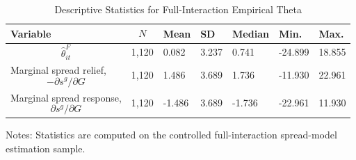 \begin{table}[H]\centering
\begin{threeparttable}
\caption{Descriptive Statistics for Full-Interaction Empirical Theta}
\label{tab:theta_descriptive_stats}
\scriptsize
\begin{tabularx}{\textwidth}{lYYYYYY}
\toprule
Variable & $$N$$ & Mean & SD & Median & Min. & Max. \\
\midrule
$$\widehat{\theta}^{F}_{it}$$ & 1,120 & 0.082 & 3.237 & 0.741 & -24.899 & 18.855 \\
Marginal spread relief, $$-\partial s^g/\partial G$$ & 1,120 & 1.486 & 3.689 & 1.736 & -11.930 & 22.961 \\
Marginal spread response, $$\partial s^g/\partial G$$ & 1,120 & -1.486 & 3.689 & -1.736 & -22.961 & 11.930 \\
\bottomrule
\end{tabularx}
\begin{tablenotes}[flushleft]\footnotesize
\item Notes: Statistics are computed on the controlled full-interaction spread-model estimation sample.
\end{tablenotes}
\end{threeparttable}
\end{table}
